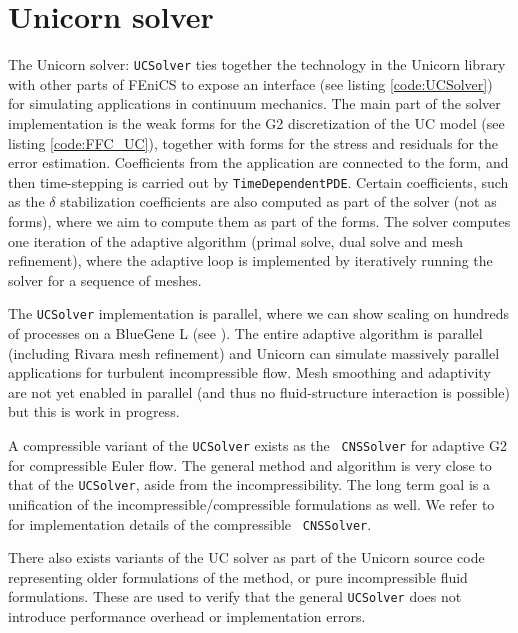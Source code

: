 \section{Unicorn solver}

The Unicorn solver: {\tt UCSolver} ties together the technology in the
Unicorn library with other parts of FEniCS to expose an interface (see
listing \ref{code:UCSolver}) for simulating applications in continuum
mechanics. The main part of the solver implementation is the weak
forms for the G2 discretization of the UC model (see
listing \ref{code:FFC_UC}), together with forms for the stress and
residuals for the error estimation. Coefficients from the application
are connected to the form, and then time-stepping is carried out by
{\tt TimeDependentPDE}. Certain coefficients, such as the $\delta$
stabilization coefficients are also computed as part of the solver
(not as forms), where we aim to compute them as part of the forms. The
solver computes one iteration of the adaptive algorithm (primal solve,
dual solve and mesh refinement), where the adaptive loop is
implemented by iteratively running the solver for a sequence of
meshes.

The {\tt UCSolver} implementation is parallel, where we can show
scaling on hundreds of processes on a BlueGene L (see
\cite{Jansson2008}). The entire adaptive algorithm is parallel (including
Rivara mesh refinement) and Unicorn can simulate massively parallel
applications for turbulent incompressible flow. Mesh smoothing and
adaptivity are not yet enabled in parallel (and thus no
fluid-structure interaction is possible) but this is work in progress.

A compressible variant of the {\tt UCSolver} exists as the {\tt
  CNSSolver} for adaptive G2 for compressible Euler flow. The general
method and algorithm is very close to that of the {\tt UCSolver},
aside from the incompressibility. The long term goal is a unification
of the incompressible/compressible formulations as well. We refer to
\cite{Nazarov2009} for implementation details of the compressible {\tt
  CNSSolver}.

There also exists variants of the UC solver as part of the Unicorn
source code representing older formulations of the method, or pure
incompressible fluid formulations. These are used to verify that the
general {\tt UCSolver} does not introduce performance overhead or
implementation errors.



